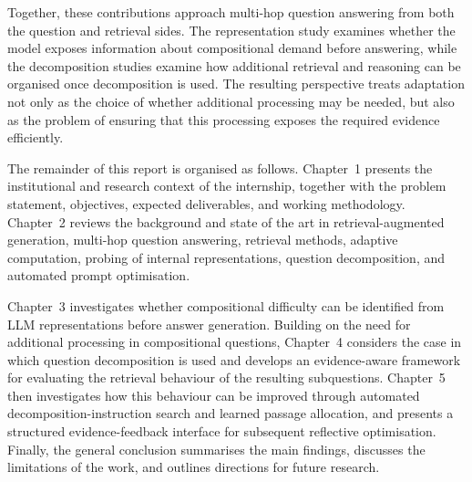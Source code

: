 Together, these contributions approach multi-hop question answering from both
the question and retrieval sides. The representation study examines whether
the model exposes information about compositional demand before answering,
while the decomposition studies examine how additional retrieval and reasoning
can be organised once decomposition is used. The resulting perspective treats
adaptation not only as the choice of whether additional processing may be
needed, but also as the problem of ensuring that this processing exposes the
required evidence efficiently.

The remainder of this report is organised as follows. Chapter~1 presents the
institutional and research context of the internship, together with the problem
statement, objectives, expected deliverables, and working methodology.
Chapter~2 reviews the background and state of the art in
retrieval-augmented generation, multi-hop question answering, retrieval
methods, adaptive computation, probing of internal representations, question
decomposition, and automated prompt optimisation.

Chapter~3 investigates whether compositional difficulty can be identified from
LLM representations before answer generation. Building on the need for
additional processing in compositional questions, Chapter~4 considers the case
in which question decomposition is used and develops an evidence-aware
framework for evaluating the retrieval behaviour of the resulting subquestions.
Chapter~5 then investigates how this behaviour can be improved through
automated decomposition-instruction search and learned passage allocation, and
presents a structured evidence-feedback interface for subsequent reflective
optimisation. Finally, the general conclusion summarises the main findings,
discusses the limitations of the work, and outlines directions for future
research.